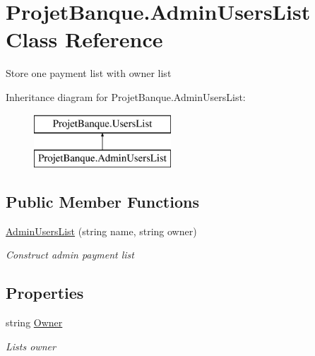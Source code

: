 \hypertarget{class_projet_banque_1_1_admin_users_list}{}\section{Projet\+Banque.\+Admin\+Users\+List Class Reference}
\label{class_projet_banque_1_1_admin_users_list}


Store one payment list with owner list  


Inheritance diagram for Projet\+Banque.\+Admin\+Users\+List\+:\begin{figure}[H]
\begin{center}
\leavevmode
\includegraphics[height=2.000000cm]{class_projet_banque_1_1_admin_users_list}
\end{center}
\end{figure}
\subsection*{Public Member Functions}
\begin{DoxyCompactItemize}
\item 
\mbox{\hyperlink{class_projet_banque_1_1_admin_users_list_a91fe6ff510354c57d01bedc8f7b9b22c}{Admin\+Users\+List}} (string name, string owner)
\begin{DoxyCompactList}\small\item\em Construct admin payment list \end{DoxyCompactList}\end{DoxyCompactItemize}
\subsection*{Properties}
\begin{DoxyCompactItemize}
\item 
string \mbox{\hyperlink{class_projet_banque_1_1_admin_users_list_a7e3c434e0b4a1e299d34bee42c8e3b1f}{Owner}}
\begin{DoxyCompactList}\small\item\em List\textquotesingle{}s owner \end{DoxyCompactList}\end{DoxyCompactItemize}


